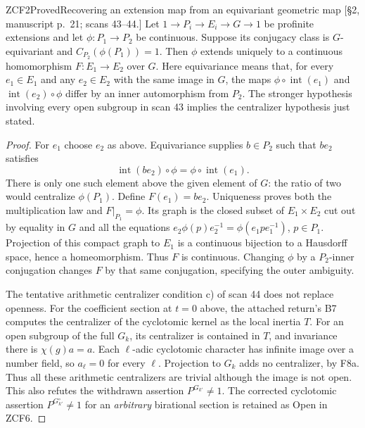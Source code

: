 \begin{result}{ZCF2}{Proved}{Recovering an extension map from an equivariant geometric map}
\textup{[\S2, manuscript p.\ 21; scans 43--44.]}
Let $1\to P_i\to E_i\to G\to1$ be profinite extensions and let
$\phi:P_1\to P_2$ be continuous. Suppose its conjugacy class is
$G$-equivariant and $C_{P_2}(\phi(P_1))=1$. Then $\phi$ extends
uniquely to a continuous homomorphism $F:E_1\to E_2$ over $G$.
Here equivariance means that, for every $e_1\in E_1$ and any $e_2\in E_2$
with the same image in $G$, the maps
$\phi\circ\operatorname{int}(e_1)$ and
$\operatorname{int}(e_2)\circ\phi$ differ by an inner automorphism
from $P_2$. The stronger hypothesis involving every open subgroup in
scan 43 implies the centralizer hypothesis just stated.
\end{result}
\begin{proof}
For $e_1$ choose $e_2$ as above. Equivariance supplies $b\in P_2$
such that $be_2$ satisfies
\[
 \operatorname{int}(be_2)\circ\phi
       =\phi\circ\operatorname{int}(e_1).
\]
There is only one such element above the given element of $G$: the
ratio of two would centralize $\phi(P_1)$. Define $F(e_1)=be_2$.
Uniqueness proves both the multiplication law and $F|_{P_1}=\phi$.
Its graph is the closed subset of $E_1\times E_2$ cut out by equality
in $G$ and all the equations
$e_2\phi(p)e_2^{-1}=\phi(e_1pe_1^{-1})$, $p\in P_1$.
Projection of this compact graph to $E_1$ is a continuous bijection
to a Hausdorff space, hence a homeomorphism. Thus $F$ is continuous.
Changing $\phi$ by a $P_2$-inner conjugation changes $F$ by that same
conjugation, specifying the outer ambiguity.

The tentative arithmetic centralizer condition c) of scan 44 does
not replace openness. For the coefficient section at $t=0$ above,
the attached return's B7 computes the centralizer of the cyclotomic
kernel as the local inertia $T$. For an open subgroup of the full
$G_k$, its centralizer is contained in $T$, and invariance there is
$\chi(g)a=a$. Each $\ell$-adic cyclotomic character has infinite
image over a number field, so $a_\ell=0$ for every $\ell$.
Projection to $G_k$ adds no centralizer, by F8a. Thus all these
arithmetic centralizers are trivial although the image is not open.
This also refutes the withdrawn assertion $P^{G_{k'}}\ne1$.
The corrected cyclotomic assertion $P^{G_{k'}^\circ}\ne1$ for an
\emph{arbitrary} birational section is retained as Open in ZCF6.
\end{proof}

